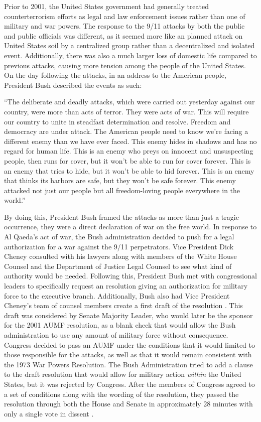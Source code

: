 \documentclass[12pt]{article}
\begin{document}
Prior to 2001, the United States government had generally treated counterterrorism efforts as legal and law enforcement issues rather than one of military and war powers.
The response to the 9/11 attacks by both the public and public officials was different, as it seemed more like an planned attack on United States soil by a centralized group rather than a decentralized and isolated event.
Additionally, there was also a much larger loss of domestic life compared to previous attacks, causing more tension among the people of the United States.
On the day following the attacks, in an address to the American people, President Bush described the events as such:

\begin{displayquote}
``The deliberate and deadly attacks, which were carried out yesterday against our country, were more than acts of terror. They were acts of war. This will require our country to unite in steadfast determination and resolve. Freedom and democracy are under attack. The American people need to know we're facing a different enemy than we have ever faced. This enemy hides in shadows and has no regard for human life. This is an enemy who preys on innocent and unsuspecting people, then runs for cover, but it won't be able to run for cover forever. This is an enemy that tries to hide, but it won't be able to hid forever. This is an enemy that thinks its harbors are safe, but they won't be safe forever. This enemy attacked not just our people but all freedom-loving people everywhere in the world.'' \autocite{bush2001}
\end{displayquote}

By doing this, President Bush framed the attacks as more than just a tragic occurrence, they were a direct declaration of war on the free world.
In response to Al Qaeda's act of war, the Bush administration decided to push for a legal authorization for a war against the 9/11 perpetrators.
Vice President Dick Cheney consulted with his lawyers along with members of the White House Counsel and the Department of Justice Legal Counsel to see what kind of authority would be needed.
Following this, President Bush met with congressional leaders to specifically request an resolution giving an authorization for military force to the executive branch.
Additionally, Bush also had Vice President Cheney's team of counsel members create a first draft of the resolution \autocite[176]{murray2015}.
This draft was considered by Senate Majority Leader, who would later be the sponsor for the 2001 AUMF resolution, as a blank check that would allow the Bush administration to use any amount of military force without consequence.
Congress decided to pass an AUMF under the conditions that it would limited to those responsible for the attacks, as well as that it would remain consistent with the 1973 War Powers Resolution.
The Bush Administration tried to add a clause to the draft resolution that would allow for military action \emph{within} the United States, but it was rejected by Congress.
After the members of Congress agreed to a set of conditions along with the wording of the resolution, they passed the resolution through both the House and Senate in approximately 28 minutes with only a single vote in dissent \autocite[177]{murray2015}.
\end{document}

